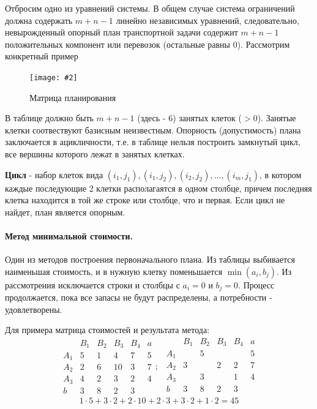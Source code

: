 \documentclass[a4paper, 14pt]{extarticle}
\newcommand{\screenshot}[3]{
	\begin{figure}[h]
		\centering
		\texttt{[image: \#2]}
		\caption{#3}
	\end{figure}
}
\numberwithin{equation}{section}
\begin{document}
Отбросим одно из уравнений системы. В общем случае система ограничений должна содержать $m+n-1$ линейно независимых уравнений, следовательно, невырожденный опорный план транспортной задачи содержит $m+n-1$ положительных компонент или перевозок (остальные равны 0). Рассмотрим конкретный пример
\screenshot{width=\textwidth}{img/S006.jpg}{Матрица планирования}
В таблице должно быть $m+n-1$ (здесь - $6$) занятых клеток ($>0$). Занятые клетки соотвествуют базисным неизвестным. Опорность (допустимость) плана заключается в ацикличности, т.е. в таблице нельзя построить замкнутый цикл, все вершины которого лежат в занятых клетках.

\textbf{Цикл} - набор клеток вида $(i_1, j_1), (i_1, j_2), (i_2, j_2), ..., (i_m, j_1)$, в котором каждые последующие 2 клетки располагаятся в одном столбце, причем последняя клетка находится в той же строке или столбце, что и первая. Если цикл не найдет, план является опорным. 

\paragraph{Метод минимальной стоимости.} Один из методов построения первоначального плана. Из таблицы выбивается наименьшая стоимость, и в нужную клетку поменьшается $\min (a_i, b_j)$. Из рассмотрения исключается строки и столбцы с $a_i = 0$ и $b_j=0$. 
Процесс продолжается, пока все запасы не будут распределены, а потребности - удовлетворены. 

Для примера матрица стоимостей и результата метода:
\[
\begin{array}{c|cccc|c}
    & B_1 & B_2 & B_3 & B_4 & a \\
    \hline
    A_1 & 5 & 1 & 4 & 7 & 5\\
    A_2 & 2 & 6 & 10 & 3 & 7\\
    A_3 & 4 & 2 & 3 & 2 & 4\\
    \hline
    b & 3 & 8 & 2 & 3 & 
\end{array}; \ \ 
\begin{array}{c|cccc|c}
& B_1 & B_2 & B_3 & B_4 & a \\
\hline
A_1 & & 5 & & & 5\\
A_2 & 3 & & 2 & 2 & 7\\
A_3 & & 3 & & 1 & 4\\
\hline
b & 3 & 8 & 2 & 3\\
\end{array} \]
\[ 1 \cdot 5 + 3 \cdot 2 + 2 \cdot 10 + 2 \cdot 3 + 3 \cdot 2 + 1 \cdot 2 = 45 \]
\end{document}

